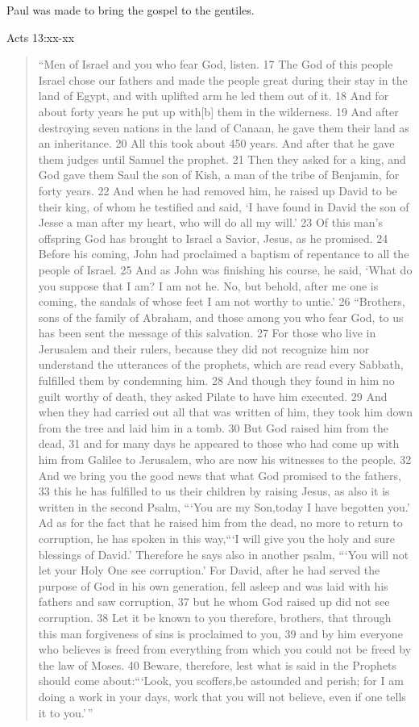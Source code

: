 \documentclass[
]{book}
\begin{document}
Paul was made to bring the gospel to the gentiles.

Acts 13:xx-xx

\begin{quote}
``Men of Israel and you who fear God, listen. 17 The God of this people Israel chose our fathers and made the people great during their stay in the land of Egypt, and with uplifted arm he led them out of it. 18 And for about forty years he put up with{[}b{]} them in the wilderness. 19 And after destroying seven nations in the land of Canaan, he gave them their land as an inheritance. 20 All this took about 450 years. And after that he gave them judges until Samuel the prophet. 21 Then they asked for a king, and God gave them Saul the son of Kish, a man of the tribe of Benjamin, for forty years. 22 And when he had removed him, he raised up David to be their king, of whom he testified and said, `I have found in David the son of Jesse a man after my heart, who will do all my will.' 23 Of this man's offspring God has brought to Israel a Savior, Jesus, as he promised. 24 Before his coming, John had proclaimed a baptism of repentance to all the people of Israel. 25 And as John was finishing his course, he said, `What do you suppose that I am? I am not he. No, but behold, after me one is coming, the sandals of whose feet I am not worthy to untie.'
26 ``Brothers, sons of the family of Abraham, and those among you who fear God, to us has been sent the message of this salvation. 27 For those who live in Jerusalem and their rulers, because they did not recognize him nor understand the utterances of the prophets, which are read every Sabbath, fulfilled them by condemning him. 28 And though they found in him no guilt worthy of death, they asked Pilate to have him executed. 29 And when they had carried out all that was written of him, they took him down from the tree and laid him in a tomb. 30 But God raised him from the dead, 31 and for many days he appeared to those who had come up with him from Galilee to Jerusalem, who are now his witnesses to the people. 32 And we bring you the good news that what God promised to the fathers, 33 this he has fulfilled to us their children by raising Jesus, as also it is written in the second Psalm,
```You are my Son,today I have begotten you.'
Ad as for the fact that he raised him from the dead, no more to return to corruption, he has spoken in this way,```I will give you the holy and sure blessings of David.'
Therefore he says also in another psalm, ```You will not let your Holy One see corruption.'
For David, after he had served the purpose of God in his own generation, fell asleep and was laid with his fathers and saw corruption, 37 but he whom God raised up did not see corruption. 38 Let it be known to you therefore, brothers, that through this man forgiveness of sins is proclaimed to you, 39 and by him everyone who believes is freed from everything from which you could not be freed by the law of Moses. 40 Beware, therefore, lest what is said in the Prophets should come about:```Look, you scoffers,be astounded and perish;
for I am doing a work in your days, work that you will not believe, even if one tells it to you.'\,''
\end{quote}
\end{document}
